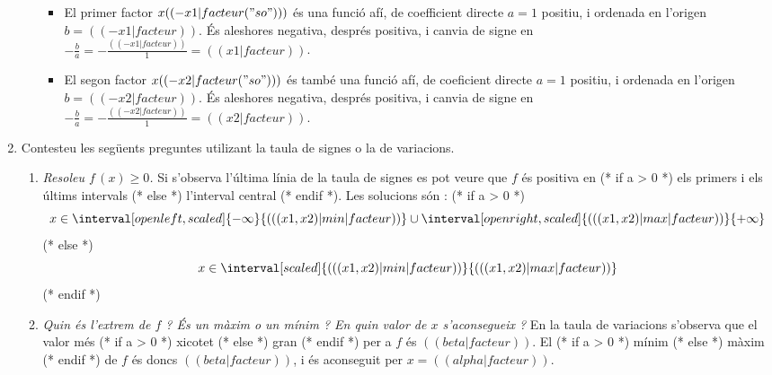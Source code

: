\begin{enumerate}
\begin{enumerate}
\begin{itemize}
\item El primer factor $x (( -x1|facteur("so") ))$ és una funció afí, de coefficient directe $a=1$ positiu, i ordenada en l'origen $b=(( -x1|facteur ))$. És aleshores negativa, després positiva, i canvia de signe en $-\frac{b}{a}=-\frac{(( -x1|facteur ))}{1}=(( x1|facteur ))$.
\item El segon factor $x (( -x2|facteur("so") ))$ és també una funció afí, de coeficient directe $a=1$ positiu, i ordenada en l'origen $b=(( -x2|facteur ))$. És aleshores negativa, després positiva, i canvia de signe en $-\frac{b}{a}=-\frac{(( -x2|facteur ))}{1}=(( x2|facteur ))$.
\end{itemize}
\begin{center}
\end{center}
\end{enumerate}
\item Contesteu les següents preguntes utilizant la taula de signes o la de variacions.
\begin{enumerate}
\item \emph{Resoleu $f\,(x)\geqslant0$.} Si s'observa l'última línia de la taula de signes es pot veure que $f$ és positiva en
(* if a > 0 *) els primers i els últims intervals (* else *) l'interval central (* endif *).
Les solucions són :
(* if a > 0 *)
   \[ x\in\interval[open left, scaled]{-\infty}{(( (x1, x2)|min|facteur ))} \cup \interval[open right, scaled]{(( (x1, x2)|max|facteur ))}{+\infty} \]
(* else *)
   \[ x\in\interval[scaled]{(( (x1, x2)|min|facteur ))}{(( (x1, x2)|max|facteur ))} \]
(* endif *)
\item \emph{ Quin és l'extrem de $f$ ?  És un màxim o un mínim ?  En quin valor de $x$ s'aconsegueix ?} En la taula de variacions s'observa que el valor més
(* if a > 0 *) xicotet (* else *) gran (* endif *)
per a $f$ és $(( beta|facteur ))$. El
(* if a > 0 *) mínim (* else *) màxim (* endif *)
de $f$ és doncs $(( beta|facteur ))$, i és aconseguit per $x=(( alpha|facteur ))$.
\end{enumerate}
\end{enumerate}
